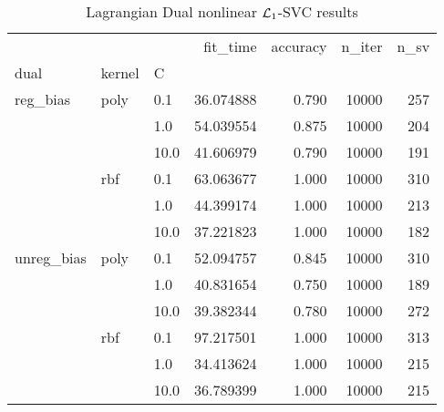 \begin{table}[H]
\centering
\caption{Lagrangian Dual nonlinear $\protect \mathcal{L}_1$-SVC results}
\label{nonlinear_lagrangian_dual_l1_svc_cv_results}
\begin{tabular}{lllrrrr}
\toprule
           &     &      &   fit\_time &  accuracy &  n\_iter &  n\_sv \\
dual & kernel & C &            &           &         &       \\
\midrule
reg\_bias & poly & 0.1  &  36.074888 &     0.790 &   10000 &   257 \\
           &     & 1.0  &  54.039554 &     0.875 &   10000 &   204 \\
           &     & 10.0 &  41.606979 &     0.790 &   10000 &   191 \\
           & rbf & 0.1  &  63.063677 &     1.000 &   10000 &   310 \\
           &     & 1.0  &  44.399174 &     1.000 &   10000 &   213 \\
           &     & 10.0 &  37.221823 &     1.000 &   10000 &   182 \\
unreg\_bias & poly & 0.1  &  52.094757 &     0.845 &   10000 &   310 \\
           &     & 1.0  &  40.831654 &     0.750 &   10000 &   189 \\
           &     & 10.0 &  39.382344 &     0.780 &   10000 &   272 \\
           & rbf & 0.1  &  97.217501 &     1.000 &   10000 &   313 \\
           &     & 1.0  &  34.413624 &     1.000 &   10000 &   215 \\
           &     & 10.0 &  36.789399 &     1.000 &   10000 &   215 \\
\bottomrule
\end{tabular}
\end{table}
